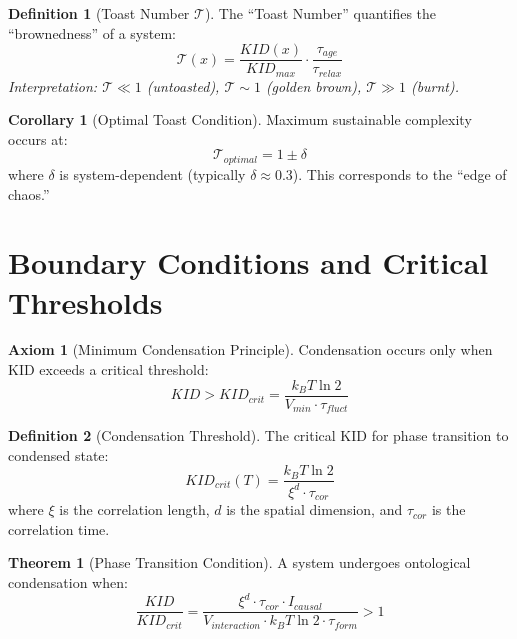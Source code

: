 \documentclass[11pt,a4paper]{article}
\theoremstyle{definition}
\newtheorem{definition}{Definition}[section]
\newtheorem{theorem}{Theorem}[section]
\newtheorem{corollary}{Corollary}[section]
\newtheorem{axiom}{Axiom}[section]
\begin{document}
\begin{definition}[Toast Number $\mathcal{T}$]
The ``Toast Number'' quantifies the ``brownedness'' of a system:
\begin{equation}
\mathcal{T}(x) = \frac{KID(x)}{KID_{max}} \cdot \frac{\tau_{age}}{\tau_{relax}}
\end{equation}
\textit{Interpretation: $\mathcal{T} \ll 1$ (untoasted), $\mathcal{T} \sim 1$ (golden brown), $\mathcal{T} \gg 1$ (burnt).}
\end{definition}

\begin{corollary}[Optimal Toast Condition]
Maximum sustainable complexity occurs at:
\begin{equation}
\mathcal{T}_{optimal} = 1 \pm \delta
\end{equation}
where $\delta$ is system-dependent (typically $\delta \approx 0.3$). This corresponds to the ``edge of chaos.''
\end{corollary}

\section{Boundary Conditions and Critical Thresholds}

\begin{axiom}[Minimum Condensation Principle]
Condensation occurs only when KID exceeds a critical threshold:
\begin{equation}
KID > KID_{crit} = \frac{k_B T \ln 2}{V_{min} \cdot \tau_{fluct}}
\end{equation}
\end{axiom}

\begin{definition}[Condensation Threshold]
The critical KID for phase transition to condensed state:
\begin{equation}
KID_{crit}(T) = \frac{k_B T \ln 2}{\xi^d \cdot \tau_{cor}}
\end{equation}
where $\xi$ is the correlation length, $d$ is the spatial dimension, and $\tau_{cor}$ is the correlation time.
\end{definition}

\begin{theorem}[Phase Transition Condition]
A system undergoes ontological condensation when:
\begin{equation}
\frac{KID}{KID_{crit}} = \frac{\xi^d \cdot \tau_{cor} \cdot I_{causal}}{V_{interaction} \cdot k_B T \ln 2 \cdot \tau_{form}} > 1
\end{equation}
\end{theorem}
\end{document}
